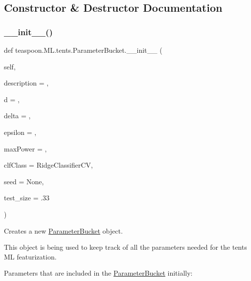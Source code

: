 \subsection{Constructor \& Destructor Documentation}
\mbox{\label{classteaspoon_1_1_m_l_1_1tents_1_1_parameter_bucket_a3134297e20272c91ac6ab54a92efb6e5}} 
\subsubsection{\texorpdfstring{\+\_\+\+\_\+init\+\_\+\+\_\+()}{\_\_init\_\_()}}
{\footnotesize\ttfamily def teaspoon.\+M\+L.\+tents.\+Parameter\+Bucket.\+\_\+\+\_\+init\+\_\+\+\_\+ (\begin{DoxyParamCaption}\item[{}]{self,  }\item[{}]{description = {\ttfamily \textquotesingle{}\textquotesingle{}},  }\item[{}]{d = {},  }\item[{}]{delta = {},  }\item[{}]{epsilon = {},  }\item[{}]{max\+Power = {},  }\item[{}]{clf\+Class = {\ttfamily RidgeClassifierCV},  }\item[{}]{seed = {\ttfamily None},  }\item[{}]{test\+\_\+size = {\ttfamily .33} }\end{DoxyParamCaption})}



Creates a new \hyperlink{classteaspoon_1_1_m_l_1_1tents_1_1_parameter_bucket}{Parameter\+Bucket} object. 

This object is being used to keep track of all the parameters needed for the tents ML featurization.

Parameters that are included in the \hyperlink{classteaspoon_1_1_m_l_1_1tents_1_1_parameter_bucket}{Parameter\+Bucket} initially\+:


